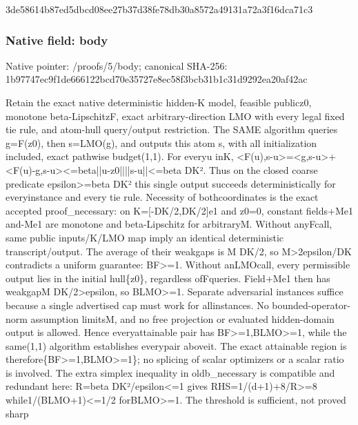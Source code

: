 \documentclass[10pt,a4paper]{article}
\begin{document}
\begingroup\raggedright\sloppy 3de58614b87ed5dbcd08ee27b37d38fe78db30a8572a49131a72a3f16dca71c3\par\endgroup

\subsubsection{Native field: body}
Native pointer: /proofs/5/body; canonical SHA-256: 1b97747ec9f1de666122bcd70e35727e8ec58f3bcb31b1c31d9292ea20af42ac

\begingroup\raggedright\sloppy Retain the exact native deterministic hidden-K model,\allowbreak{} feasible publicz0,\allowbreak{} monotone beta-LipschitzF,\allowbreak{} exact arbitrary-direction LMO with every legal fixed tie rule,\allowbreak{} and atom-hull query/\allowbreak{}output restriction. The SAME algorithm queries g=\allowbreak{}F(z0),\allowbreak{} then s=\allowbreak{}LMO(g),\allowbreak{} and outputs this atom s,\allowbreak{} with all initialization included,\allowbreak{} exact pathwise budget(1,\allowbreak{}1). For everyu inK,\allowbreak{} <F(u),\allowbreak{}s-u>=\allowbreak{}<g,\allowbreak{}s-u>+<F(u)-g,\allowbreak{}s-u><=\allowbreak{}beta||u-z0||||s-u||<=\allowbreak{}beta DK{\AtlasUnicodeText ²}\allowbreak{}. Thus on the closed coarse predicate epsilon>=\allowbreak{}beta DK{\AtlasUnicodeText ²}\allowbreak{} this single output succeeds deterministically for everyinstance and every tie rule. Necessity of bothcoordinates is the exact accepted proof\_\allowbreak{}necessary:\allowbreak{} on K=\allowbreak{}[-DK/\allowbreak{}2,\allowbreak{}DK/\allowbreak{}2]e1 and z0=\allowbreak{}0,\allowbreak{} constant fields+Me1 and-Me1 are monotone and beta-Lipschitz for arbitraryM. Without anyFcall,\allowbreak{} same public inputs/\allowbreak{}K/\allowbreak{}LMO map imply an identical deterministic transcript/\allowbreak{}output. The average of their weakgaps is M DK/\allowbreak{}2,\allowbreak{} so M>2epsilon/\allowbreak{}DK contradicts a uniform guarantee:\allowbreak{} BF>=\allowbreak{}1. Without anLMOcall,\allowbreak{} every permissible output lies in the initial hull\{z0\},\allowbreak{} regardless ofFqueries. Field+Me1 then has weakgapM DK/\allowbreak{}2>epsilon,\allowbreak{} so BLMO>=\allowbreak{}1. Separate adversarial instances suffice because a single advertised cap must work for allinstances. No bounded-operator-norm assumption limitsM,\allowbreak{} and no free projection or evaluated hidden-domain output is allowed. Hence everyattainable pair has BF>=\allowbreak{}1,\allowbreak{}BLMO>=\allowbreak{}1,\allowbreak{} while the same(1,\allowbreak{}1) algorithm establishes everypair aboveit. The exact attainable region is therefore\{BF>=\allowbreak{}1,\allowbreak{}BLMO>=\allowbreak{}1\};\allowbreak{} no splicing of scalar optimizers or a scalar ratio is involved. The extra simplex inequality in oldb\_\allowbreak{}necessary is compatible and redundant here:\allowbreak{} R=\allowbreak{}beta DK{\AtlasUnicodeText ²}\allowbreak{}/\allowbreak{}epsilon<=\allowbreak{}1 gives RHS=\allowbreak{}1/\allowbreak{}(d+1)+8/\allowbreak{}R>=\allowbreak{}8 while1/\allowbreak{}(BLMO+1)<=\allowbreak{}1/\allowbreak{}2 forBLMO>=\allowbreak{}1. The threshold is sufficient,\allowbreak{} not proved sharp 
\end{document}
